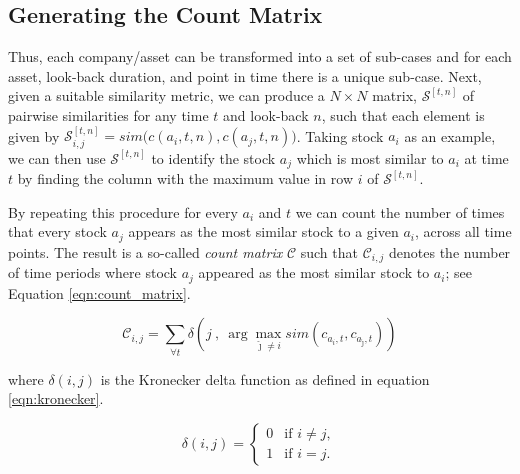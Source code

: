 \documentclass[runningheads]{llncs}
\begin{document}

\subsection{Generating the Count Matrix}\label{sec:count_matrix}
Thus, each company/asset can be transformed into a set of sub-cases and for each asset, look-back duration, and point in time there is a unique sub-case. Next, given a suitable similarity metric, we can produce a $N\times N$ matrix, $\mathcal{S}^{[t,n]}$ of pairwise similarities for any time $t$ and look-back $n$, such that each element is given by $\mathcal{S}_{i,j}^{[t, n]}=sim\big(c(a_i,t, n),c(a_j,t, n)\big)$. Taking stock $a_i$ as an example, we can then use $\mathcal{S}^{[t, n]}$ to identify the stock $a_j$ which is most similar to $a_i$ at time $t$ by finding the column with the maximum value in row $i$ of $\mathcal{S}^{[t, n]}$. 

By repeating this procedure for every $a_i$ and $t$ we can count the number of times that every stock $a_j$ appears as the most similar stock to a given $a_i$, across all time points. The result is a so-called \emph{count matrix} $\mathcal{C}$ such that $\mathcal{C}_{i,j}$ denotes the number of time periods where stock $a_j$ appeared as the most similar stock to $a_i$; see Equation \ref{eqn:count_matrix}. 

\begin{equation}
\label{eqn:count_matrix}
    \mathcal{C}_{i,j}=
    \sum_{\forall t} \delta\left(j
    ~,~
    \arg\max_{\hat{\jmath}\neq i} 
    sim \left(c_{a_i,t},c_{a_{\hat{\jmath}},t}\right)
    \right)
\end{equation}

where $\delta(i,j)$ is the Kronecker delta function as defined in equation \ref{eqn:kronecker}.

\begin{equation}\label{eqn:kronecker}
    \delta(i,j) = \begin{cases}
0 &\text{if } i \neq j,   \\
1 &\text{if } i=j.   \end{cases}
\end{equation}
\end{document}
